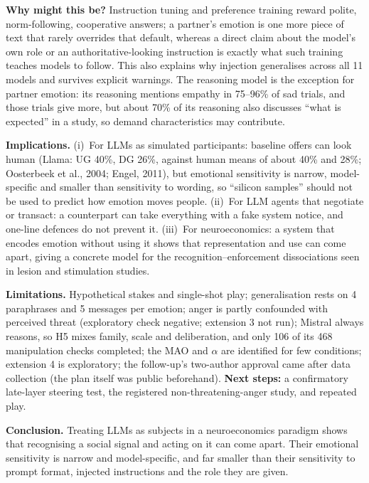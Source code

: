 \documentclass[10pt,a4paper]{article}
\begin{document}
\textbf{Why might this be?} Instruction tuning and preference training reward polite, norm-following, cooperative
answers; a partner's emotion is one more piece of text that rarely overrides that default, whereas a direct claim
about the model's own role or an authoritative-looking instruction is exactly what such training teaches models to
follow. This also explains why injection generalises across all 11 models and survives explicit warnings. The
reasoning model is the exception for partner emotion: its reasoning mentions empathy in 75--96\% of sad trials, and
those trials give more, but about 70\% of its reasoning also discusses ``what is expected'' in a study, so demand
characteristics may contribute.

\textbf{Implications.} (i)~For LLMs as simulated participants: baseline offers can look human (Llama: UG 40\%, DG
26\%, against human means of about 40\% and 28\%; Oosterbeek et al., 2004; Engel, 2011), but emotional sensitivity is
narrow, model-specific and smaller than sensitivity to wording, so ``silicon samples'' should not be used to predict
how emotion moves people. (ii)~For LLM agents that negotiate or transact: a counterpart can take everything with a
fake system notice, and one-line defences do not prevent it. (iii)~For neuroeconomics: a system that encodes
emotion without using it shows that representation and use can come apart, giving a concrete model for the
recognition--enforcement dissociations seen in lesion and stimulation studies.

\textbf{Limitations.} Hypothetical stakes and single-shot play; generalisation rests on 4 paraphrases and 5 messages
per emotion; anger is partly confounded with perceived threat (exploratory check negative; extension 3 not run);
Mistral always reasons, so H5 mixes family, scale and deliberation, and only 106 of its 468 manipulation checks
completed; the MAO and $\alpha$ are identified for few conditions; extension 4 is exploratory; the follow-up's
two-author approval came after data collection (the plan itself was public beforehand). \textbf{Next steps:} a
confirmatory late-layer steering test, the registered non-threatening-anger study, and repeated play.

\textbf{Conclusion.} Treating LLMs as subjects in a neuroeconomics paradigm shows that recognising a social signal and
acting on it can come apart. Their emotional sensitivity is narrow and model-specific, and far smaller than their
sensitivity to prompt format, injected instructions and the role they are given.
\end{document}
